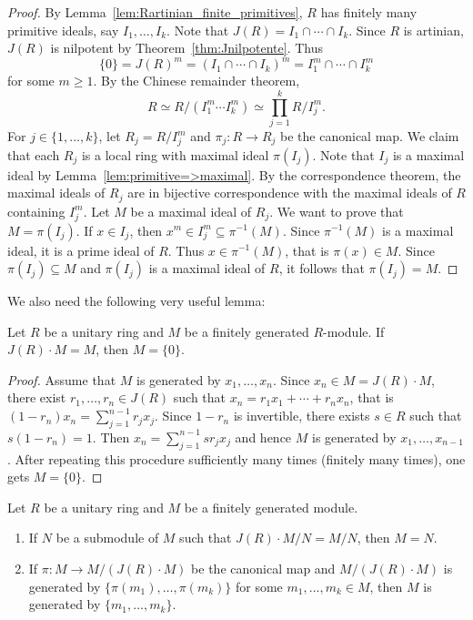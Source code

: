 \begin{proof}
    By Lemma~\ref{lem:Rartinian_finite_primitives}, $R$ has finitely many primitive ideals, say 
    $I_1,\dots,I_k$. Note that $J(R)=I_1\cap\cdots\cap I_k$. 
    Since $R$ is artinian, $J(R)$ is nilpotent by Theorem~\ref{thm:Jnilpotente}. Thus
    \[
    \{0\}=J(R)^m=(I_1\cap\cdots\cap I_k)^m=I_1^m\cap\cdots\cap I_k^m
    \]
    for some $m\geq1$. By the Chinese remainder theorem, 
    \[
    R\simeq R/(I_1^m\cdots I_k^m)\simeq \prod_{j=1}^k R/I_j^m.
    \]
    For $j\in\{1,\dots,k\}$, let $R_j=R/I_j^m$ and 
    $\pi_j\colon R\to R_j$ be the canonical map. 
    We claim that each $R_j$ is a local ring 
    with maximal ideal $\pi(I_j)$. Note that $I_j$ is a maximal ideal by 
    Lemma~\ref{lem:primitive=>maximal}. 
    By the correspondence theorem, the maximal ideals of $R_j$ are in bijective 
    correspondence with
    the maximal ideals of $R$ containing $I_j^m$. 
    Let $M$ be a maximal ideal of $R_j$. We want to prove that $M=\pi(I_j)$. 
    If $x\in I_j$, then $x^m\in I_j^m\subseteq\pi^{-1}(M)$. Since $\pi^{-1}(M)$ is a maximal ideal, 
    it is a prime ideal of $R$. Thus $x\in\pi^{-1}(M)$, that is $\pi(x)\in M$. 
    Since $\pi(I_j)\subseteq M$ and $\pi(I_j)$ is a maximal ideal of $R$, it follows
    that $\pi(I_j)=M$. 
\end{proof}

We also need the following very useful lemma:

\begin{lemma}[Nakayama]
	\label{lem:Nakayama}
	Let $R$ be a unitary ring and $M$ be 
    a finitely generated $R$-module. 
    If $J(R)\cdot M=M$, then $M=\{0\}$.
\end{lemma}

\begin{proof}
	Assume that $M$ is generated by 
    $x_1,\dots,x_n$. Since $x_n\in M=J(R)\cdot M$, 
	there exist $r_1,\dots,r_n\in J(R)$ such that  $x_n=r_1x_1+\cdots+r_nx_n$, that is 
	$(1-r_n)x_n=\sum_{j=1}^{n-1}r_jx_j$. 
	Since $1-r_n$ is invertible, there exists 
    $s\in R$ such that $s(1-r_n)=1$. Then
	$x_n=\sum_{j=1}^{n-1}sr_jx_j$ 
	and hence $M$ is generated by $x_1,\dots,x_{n-1}$. After repeating this procedure sufficiently many times (finitely many times), one gets $M=\{0\}$.
\end{proof}

\begin{exercise}
\label{xca:Nakayama}
    Let $R$ be a unitary ring and $M$ be a finitely
    generated module. 
    \begin{enumerate}
        \item If $N$ be a submodule of $M$ such that $J(R)\cdot M/N=M/N$, then $M=N$. 
        \item If $\pi\colon M\to M/(J(R)\cdot M)$ be the canonical map and 
            $M/(J(R)\cdot M)$ is generated by $\{\pi(m_1),\dots,\pi(m_k)\}$ for some 
            $m_1,\dots,m_k\in M$, then $M$ is generated by $\{m_1,\dots,m_k\}$. 
    \end{enumerate}
\end{exercise}

